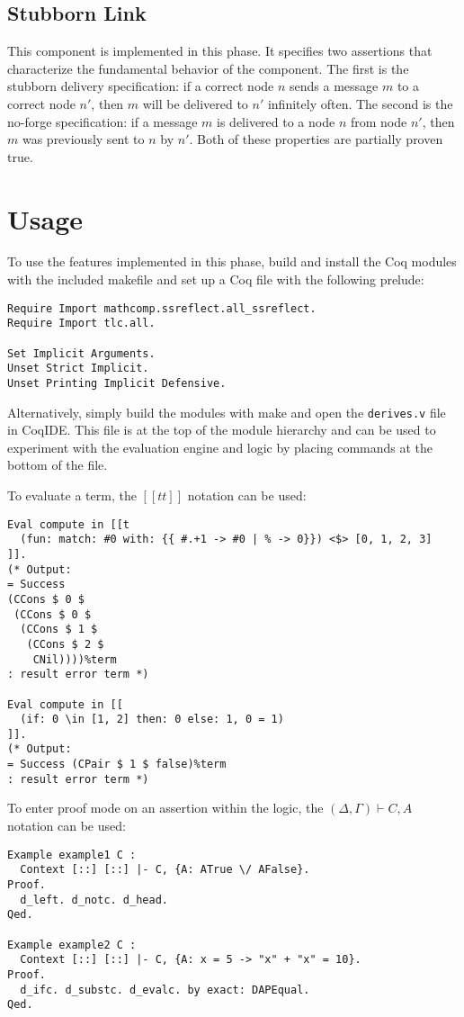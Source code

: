 \documentclass[12pt]{article}
\begin{document}
\subsection{Stubborn Link}

This component is implemented in this phase.  It specifies two
assertions that characterize the fundamental behavior of the component.
The first is the stubborn delivery specification: if a correct node $n$
sends a message $m$ to a correct node $n'$, then $m$ will be delivered
to $n'$ infinitely often.  The second is the no-forge specification: if
a message $m$ is delivered to a node $n$ from node $n'$, then $m$ was
previously sent to $n$ by $n'$.  Both of these properties are partially
proven true.

\section{Usage}

To use the features implemented in this phase, build and install the
Coq modules with the included makefile and set up a Coq file with the
following prelude:

\begin{verbatim}
Require Import mathcomp.ssreflect.all_ssreflect.
Require Import tlc.all.

Set Implicit Arguments.
Unset Strict Implicit.
Unset Printing Implicit Defensive.
\end{verbatim}

Alternatively, simply build the modules with make and open the
\texttt{derives.v} file in CoqIDE.  This file is at the top of the
module hierarchy and can be used to experiment with the evaluation
engine and logic by placing commands at the bottom of the file.

To evaluate a term, the $[[t t ]]$ notation can be used:

\begin{verbatim}
Eval compute in [[t
  (fun: match: #0 with: {{ #.+1 -> #0 | % -> 0}}) <$> [0, 1, 2, 3]
]].
(* Output:
= Success
(CCons $ 0 $
 (CCons $ 0 $
  (CCons $ 1 $
   (CCons $ 2 $
    CNil))))%term
: result error term *)

Eval compute in [[
  (if: 0 \in [1, 2] then: 0 else: 1, 0 = 1)
]].
(* Output:
= Success (CPair $ 1 $ false)%term
: result error term *)
\end{verbatim}

To enter proof mode on an assertion within the logic, the
$(\Delta, \Gamma) \vdash C, A$ notation can be used:

\begin{verbatim}
Example example1 C :
  Context [::] [::] |- C, {A: ATrue \/ AFalse}.
Proof.
  d_left. d_notc. d_head.
Qed.

Example example2 C :
  Context [::] [::] |- C, {A: x = 5 -> "x" + "x" = 10}.
Proof.
  d_ifc. d_substc. d_evalc. by exact: DAPEqual.
Qed.
\end{verbatim}
\end{document}
